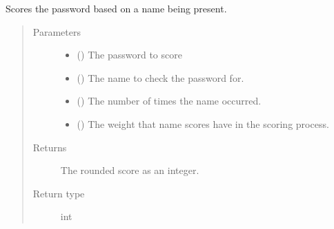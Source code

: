 \documentclass[letterpaper,10pt,english]{sphinxmanual}
\begin{document}
\begin{fulllineitems}
\begin{fulllineitems}
\end{fulllineitems}


\begin{fulllineitems}
\label{\detokenize{EntroPass:EntroPass.pwd_score.Pwd_score.score_pwd_name}}
\sphinxAtStartPar
Scores the password based on a name being present.
\begin{quote}\begin{description}
\item[{Parameters}] \leavevmode\begin{itemize}
\item {} 
\sphinxAtStartPar
{} () \textendash{} The password to score

\item {} 
\sphinxAtStartPar
{} () \textendash{} The name to check the password for.

\item {} 
\sphinxAtStartPar
{} () \textendash{} The number of times the name occurred.

\item {} 
\sphinxAtStartPar
{} (\sphinxstyleliteralemphasis{\sphinxupquote{, }}) \textendash{} The weight that name scores have in the scoring process.

\end{itemize}

\item[{Returns}] \leavevmode
\sphinxAtStartPar
The rounded score as an integer.

\item[{Return type}] \leavevmode
\sphinxAtStartPar
int

\end{description}\end{quote}


\end{fulllineitems}
\end{fulllineitems}
\end{document}
